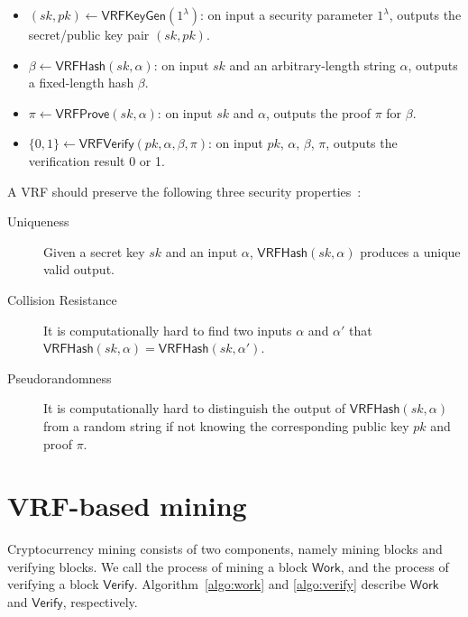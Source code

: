 \documentclass[a0,portrait]{a0poster}
\begin{document}
\begin{multicols}{2}
\begin{itemize}
    \item $(sk, pk) \gets \mathsf{VRFKeyGen}(1^{\lambda})$: on input a security parameter $1^{\lambda}$, outputs the secret/public key pair $(sk, pk)$.
    \item $\beta \gets \mathsf{VRFHash}(sk, \alpha)$: on input $sk$ and an arbitrary-length string $\alpha$, outputs a fixed-length hash $\beta$.
    \item $\pi \gets \mathsf{VRFProve}(sk, \alpha)$: on input $sk$ and $\alpha$, outputs the proof $\pi$ for $\beta$.
    \item $\{0, 1\} \gets \mathsf{VRFVerify}(pk, \alpha, \beta, \pi)$: on input $pk$, $\alpha$, $\beta$, $\pi$, outputs the verification result 0 or 1.
\end{itemize}

A VRF should preserve the following three security properties~\cite{goldberg2017draft}:

\begin{description}
    \item[Uniqueness] Given a secret key $sk$ and an input $\alpha$, $\mathsf{VRFHash}(sk, \alpha)$ produces a unique valid output.
    \item[Collision Resistance] It is computationally hard to find two inputs $\alpha$ and $\alpha'$ that $\mathsf{VRFHash}(sk, \alpha) = \mathsf{VRFHash}(sk, \alpha')$.
    \item[Pseudorandomness] It is computationally hard to distinguish the output of $\mathsf{VRFHash}(sk, \alpha)$ from a random string if not knowing the corresponding public key $pk$ and proof $\pi$.
\end{description}




\section*{VRF-based mining}

Cryptocurrency mining consists of two components, namely mining blocks and verifying blocks.
We call the process of mining a block $\mathsf{Work}$, and the process of verifying a block $\mathsf{Verify}$.
Algorithm~\ref{algo:work} and \ref{algo:verify} describe $\mathsf{Work}$ and $\mathsf{Verify}$, respectively.


\end{multicols}
\end{document}
